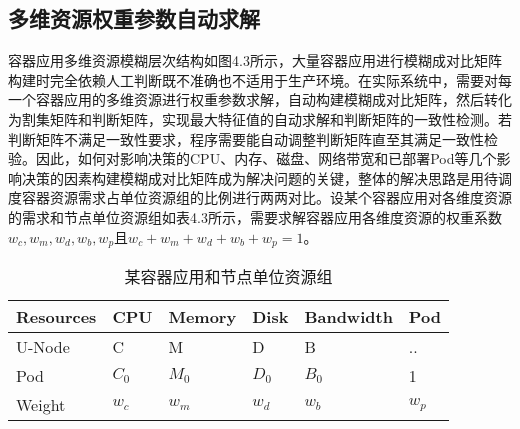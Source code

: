 \subsection{多维资源权重参数自动求解}
容器应用多维资源模糊层次结构如图4.3所示，大量容器应用进行模糊成对比矩阵构建时完全依赖人工判断既不准确也不适用于生产环境。在实际系统中，需要对每一个容器应用的多维资源进行权重参数求解，自动构建模糊成对比矩阵，然后转化为割集矩阵和判断矩阵，实现最大特征值的自动求解和判断矩阵的一致性检测。若判断矩阵不满足一致性要求，程序需要能自动调整判断矩阵直至其满足一致性检验。因此，如何对影响决策的CPU、内存、磁盘、网络带宽和已部署Pod等几个影响决策的因素构建模糊成对比矩阵成为解决问题的关键，整体的解决思路是用待调度容器资源需求占单位资源组的比例进行两两对比。设某个容器应用对各维度资源的需求和节点单位资源组如表4.3所示，需要求解容器应用各维度资源的权重系数$w_{c},w_{m},w_{d},w_{b},w_{p}$且$w_{c}+w_{m}+w_{d}+w_{b}+w_{p}=1$。
\begin{table}[htbp]
	\centering\dawu[1.3]
	\caption{某容器应用和节点单位资源组}
		\begin{tabular}{|p{1.5cm}<{\centering}|p{1.5cm}<{\centering}|p{1.5cm}<{\centering}|p{1.5cm}<{\centering}|p{1.8cm}<{\centering}|p{1.5cm}<{\centering}|} \hline
			Resources & CPU & Memory & Disk & Bandwidth & Pod \\ \hline
			U-Node & C & M & D & B & ..  \\ \hline
			Pod & $C_{0}$ & $M_{0}$ & $D_{0}$ & $B_{0}$ & 1  \\ \hline
			Weight & $w_{c}$ & $w_{m}$ & $w_{d}$ & $w_{b}$ & $w_{p}$ \\ \hline
		\end{tabular}
\end{table}

